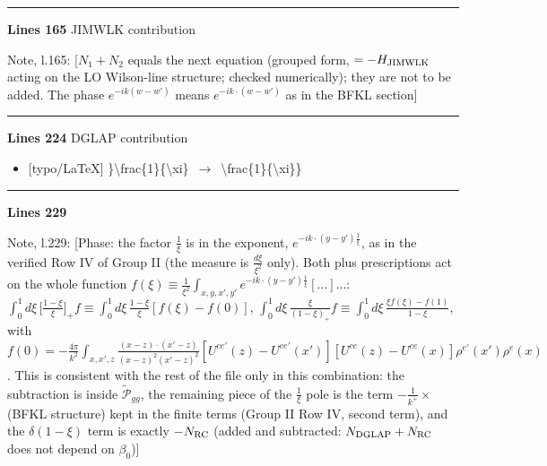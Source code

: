\documentclass[10pt]{article}
\newenvironment{notebox}{\def\FrameCommand{{\color{notebar}\vrule width 1.5pt}\hspace{6pt}}\MakeFramed{\advance\hsize-\width\FrameRestore}\small}{\endMakeFramed}
\begin{document}
\noindent\rule{\linewidth}{0.3pt}\par\noindent\textbf{Lines 165} \quad \textsf{JIMWLK contribution}\par
\begin{notebox}\textsf{\small Note, l.165:} [$N_{1}+N_{2}$ equals the next equation (grouped form, $=-H_{\rm JIMWLK}$ acting on the LO Wilson-line structure; checked numerically); they are not to be added. The phase $e^{-ik(w-w')}$ means $e^{-ik\cdot(w-w')}$ as in the BFKL section]\end{notebox}
\noindent\rule{\linewidth}{0.3pt}\par\noindent\textbf{Lines 224} \quad \textsf{DGLAP contribution} \par
\begin{itemize}[leftmargin=2.2em,itemsep=1pt,topsep=2pt]
\item[\textbf{l.224}] \textsf{\small [typo/LaTeX]} {\small\ttfamily \}\allowbreak{}\textbackslash{}\allowbreak{}frac\{1\}\allowbreak{}\{\textbackslash{}\allowbreak{}xi\}\allowbreak{}}\ $\longrightarrow$\ {\small\ttfamily \textbackslash{}\allowbreak{}frac\{1\}\allowbreak{}\{\textbackslash{}\allowbreak{}xi\}\allowbreak{}\}\allowbreak{}}
\end{itemize}
\noindent\rule{\linewidth}{0.3pt}\par\noindent\textbf{Lines 229}\par
\begin{notebox}\textsf{\small Note, l.229:} [Phase: the factor $\frac{1}{\xi}$ is in the exponent, $e^{-ik\cdot(y-y')\frac{1}{\xi}}$, as in the verified Row IV of Group II (the measure is $\frac{d\xi}{\xi^{2}}$ only). Both plus prescriptions act on the whole function $f(\xi)\equiv\frac{1}{\xi^{2}}\int_{x,y,x',y'}e^{-ik\cdot(y-y')\frac{1}{\xi}}[\dots]\dots$: $\int_{0}^{1}d\xi\,\big[\frac{1-\xi}{\xi}\big]_{+}f\equiv\int_{0}^{1}d\xi\,\frac{1-\xi}{\xi}[f(\xi)-f(0)]$, $\int_{0}^{1}d\xi\,\frac{\xi}{(1-\xi)_{+}}f\equiv\int_{0}^{1}d\xi\,\frac{\xi f(\xi)-f(1)}{1-\xi}$, with $f(0)=-\frac{4\pi}{k^{2}}\int_{x,x',z}\frac{(x-z)\cdot(x'-z)}{(x-z)^{2}(x'-z)^{2}}[U^{ce'}(z)-U^{ce'}(x')][U^{ce}(z)-U^{ce}(x)]\rho^{e'}(x')\rho^{e}(x)$. This is consistent with the rest of the file only in this combination: the subtraction is inside $\widetilde{\mathcal P}_{gg}$, the remaining piece of the $\frac{1}{\xi}$ pole is the term $-\frac{1}{k^{+}}\times$(BFKL structure) kept in the finite terms (Group II Row IV, second term), and the $\delta(1-\xi)$ term is exactly $-N_{\rm RC}$ (added and subtracted: $N_{\rm DGLAP}+N_{\rm RC}$ does not depend on $\beta_{0}$)]\end{notebox}
\end{document}
